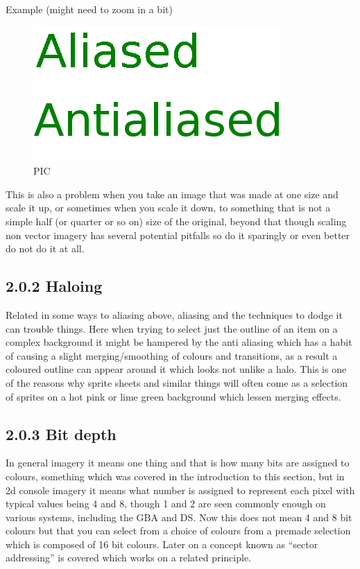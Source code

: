 \documentclass[
]{book}
\begin{document}
Example (might need to zoom in a bit)

\begin{figure}
\centering
\includegraphics{images/20_home_fast6191_romhackingguide_unrenamed_file___iginal_borders_romhackingguidebasicaliasing.png}
\caption{PIC}
\end{figure}

This is also a problem when you take an image that was made at one size and scale it up, or sometimes when you scale it down, to something that is not a simple half (or quarter or so on) size of the original, beyond that though scaling non vector imagery has several potential pitfalls so do it sparingly or even better do not do it at all.

\hypertarget{haloing}{%
\subsection{2.0.2 Haloing}\label{haloing}}

Related in some ways to aliasing above, aliasing and the techniques to dodge it can trouble things. Here when trying to select just the outline of an item on a complex background it might be hampered by the anti aliasing which has a habit of causing a slight merging/smoothing of colours and transitions, as a result a coloured outline can appear around it which looks not unlike a halo. This is one of the reasons why sprite sheets and similar things will often come as a selection of sprites on a hot pink or lime green background which lessen merging effects.

\hypertarget{bit-depth}{%
\subsection{2.0.3 Bit depth}\label{bit-depth}}

In general imagery it means one thing and that is how many bits are assigned to colours, something which was covered in the introduction to this section, but in 2d console imagery it means what number is assigned to represent each pixel with typical values being 4 and 8, though 1 and 2 are seen commonly enough on various systems, including the GBA and DS. Now this does not mean 4 and 8 bit colours but that you can select from a choice of colours from a premade selection which is composed of 16 bit colours. Later on a concept known as ``sector addressing'' is covered which works on a related principle.
\end{document}
